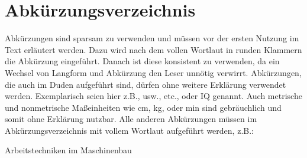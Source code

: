 \chapter*{Abkürzungsverzeichnis}

Abkürzungen sind sparsam zu verwenden und müssen vor der ersten Nutzung im Text erläutert werden. Dazu wird nach dem vollen Wortlaut in runden Klammern die Abkürzung eingeführt. Danach ist diese konsistent zu verwenden, da ein Wechsel von Langform und Abkürzung den Leser unnötig verwirrt. Abkürzungen, die auch im Duden aufgeführt sind, dürfen ohne weitere Erklärung verwendet werden. Exemplarisch seien hier z.B., usw., etc., oder IQ genannt. Auch metrische und nonmetrische Maßeinheiten wie cm, kg, oder min sind gebräuchlich und somit ohne Erklärung nutzbar. Alle anderen Abkürzungen müssen im Abkürzungsverzeichnis mit vollem Wortlaut aufgeführt werden, z.B.:

\begin{acronym}[DGPs]
	 {Arbeitstechniken im Maschinenbau}
\end{acronym}